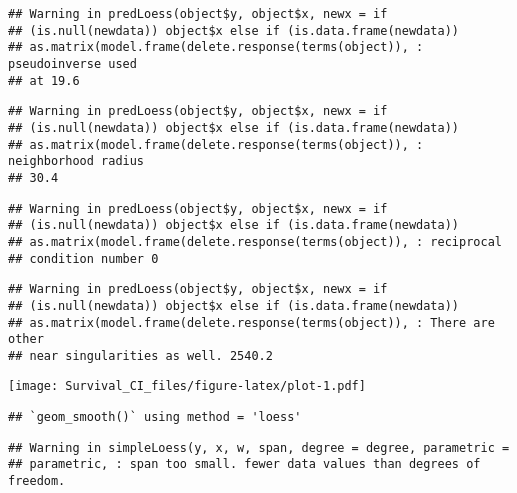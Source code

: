 \documentclass[]{article}
\newenvironment{Shaded}{\begin{snugshade}}{\end{snugshade}}
\newcommand{\KeywordTok}[1]{\textcolor[rgb]{0.13,0.29,0.53}{\textbf{{#1}}}}
\newcommand{\DataTypeTok}[1]{\textcolor[rgb]{0.13,0.29,0.53}{{#1}}}
\newcommand{\StringTok}[1]{\textcolor[rgb]{0.31,0.60,0.02}{{#1}}}
\newcommand{\NormalTok}[1]{{#1}}
\begin{document}
\begin{verbatim}
## Warning in predLoess(object$y, object$x, newx = if
## (is.null(newdata)) object$x else if (is.data.frame(newdata))
## as.matrix(model.frame(delete.response(terms(object)), : pseudoinverse used
## at 19.6
\end{verbatim}

\begin{verbatim}
## Warning in predLoess(object$y, object$x, newx = if
## (is.null(newdata)) object$x else if (is.data.frame(newdata))
## as.matrix(model.frame(delete.response(terms(object)), : neighborhood radius
## 30.4
\end{verbatim}

\begin{verbatim}
## Warning in predLoess(object$y, object$x, newx = if
## (is.null(newdata)) object$x else if (is.data.frame(newdata))
## as.matrix(model.frame(delete.response(terms(object)), : reciprocal
## condition number 0
\end{verbatim}

\begin{verbatim}
## Warning in predLoess(object$y, object$x, newx = if
## (is.null(newdata)) object$x else if (is.data.frame(newdata))
## as.matrix(model.frame(delete.response(terms(object)), : There are other
## near singularities as well. 2540.2
\end{verbatim}

\texttt{[image: Survival\_CI\_files/figure-latex/plot-1.pdf]}

\begin{Shaded}
\end{Shaded}

\begin{verbatim}
## `geom_smooth()` using method = 'loess'
\end{verbatim}

\begin{verbatim}
## Warning in simpleLoess(y, x, w, span, degree = degree, parametric =
## parametric, : span too small. fewer data values than degrees of freedom.
\end{verbatim}
\end{document}
